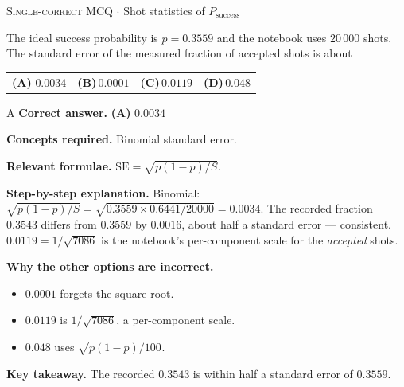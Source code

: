 \documentclass[11pt,a4paper]{article}
\newcommand{\optlabel}[1]{\textbf{(#1)}}
\newcommand{\correctlabel}[1]{\textcolor{okgreen}{\textbf{(#1)}\,\ding{51}}}
\newenvironment{qitem}[1]{\begin{list}{}{\setlength{\leftmargin}{3.3em}\setlength{\labelwidth}{3.1em}%
  \setlength{\labelsep}{0.2em}\setlength{\topsep}{3pt}\setlength{\parsep}{3pt}}\item[\textbf{Q.#1}\hfill]}{\end{list}}
\newcommand{\qsep}{\par\vspace{2pt}{\color{black!15}\hrule}\vspace{4pt}}
\newcommand{\qmeta}[2]{{\footnotesize\color{black!60}\textsc{#1} \;$\cdot$\; #2}\par}
\begin{document}
\begin{qitem}{55}
\qmeta{Single-correct MCQ}{Shot statistics of $P_{\text{success}}$}
The ideal success probability is $p = 0.3559$ and the notebook uses $20\,000$ shots. The standard error of the measured fraction of accepted shots is about
\par\smallskip\noindent\begin{tabularx}{\linewidth}{@{}*{4}{L}@{}}
\correctlabel{A}\,$0.0034$ & \optlabel{B}\,$0.0001$ & \optlabel{C}\,$0.0119$ & \optlabel{D}\,$0.048$
\end{tabularx}
\end{qitem}
\begin{solbox}{A}
\textbf{\color{brand}Correct answer.} \textcolor{okgreen}{\textbf{(A)}} $0.0034$

\textbf{\color{brand}Concepts required.} Binomial standard error.

\textbf{\color{brand}Relevant formulae.} $\mathrm{SE} = \sqrt{p(1 - p)/S}$.

\textbf{\color{brand}Step-by-step explanation.} Binomial: $\sqrt{p(1 - p)/S} = \sqrt{0.3559\times0.6441/20000} = 0.0034$. The recorded fraction $0.3543$ differs from $0.3559$ by $0.0016$, about half a standard error --- consistent.
$0.0119 = 1/\sqrt{7086}$ is the notebook's per-component scale for the \emph{accepted} shots.

\textbf{\color{brand}Why the other options are incorrect.}
\begin{itemize}[leftmargin=2.4em, itemsep=1pt, topsep=2pt]
\item[\textbf{(B)}] $0.0001$ forgets the square root.
\item[\textbf{(C)}] $0.0119$ is $1/\sqrt{7086}$, a per-component scale.
\item[\textbf{(D)}] $0.048$ uses $\sqrt{p(1-p)/100}$.
\end{itemize}
\textbf{\color{brand}Key takeaway.} The recorded $0.3543$ is within half a standard error of $0.3559$.
\end{solbox}
\qsep
\end{document}
